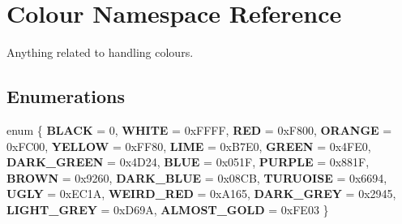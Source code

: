 \hypertarget{namespaceColour}{}\section{Colour Namespace Reference}
\label{namespaceColour}


Anything related to handling colours.  


\subsection*{Enumerations}
\begin{DoxyCompactItemize}
\item 
\mbox{\label{namespaceColour_a7eacc5e4e794b134ef740aa5426df245}} 
enum \{ \newline
{\bfseries B\+L\+A\+CK} = 0, 
{\bfseries W\+H\+I\+TE} = 0x\+F\+F\+FF, 
{\bfseries R\+ED} = 0x\+F800, 
{\bfseries O\+R\+A\+N\+GE} = 0x\+F\+C00, 
\newline
{\bfseries Y\+E\+L\+L\+OW} = 0x\+F\+F80, 
{\bfseries L\+I\+ME} = 0x\+B7\+E0, 
{\bfseries G\+R\+E\+EN} = 0x4\+F\+E0, 
{\bfseries D\+A\+R\+K\+\_\+\+G\+R\+E\+EN} = 0x4\+D24, 
\newline
{\bfseries B\+L\+UE} = 0x051F, 
{\bfseries P\+U\+R\+P\+LE} = 0x881F, 
{\bfseries B\+R\+O\+WN} = 0x9260, 
{\bfseries D\+A\+R\+K\+\_\+\+B\+L\+UE} = 0x08\+CB, 
\newline
{\bfseries T\+U\+R\+U\+O\+I\+SE} = 0x6694, 
{\bfseries U\+G\+LY} = 0x\+E\+C1A, 
{\bfseries W\+E\+I\+R\+D\+\_\+\+R\+ED} = 0x\+A165, 
{\bfseries D\+A\+R\+K\+\_\+\+G\+R\+EY} = 0x2945, 
\newline
{\bfseries L\+I\+G\+H\+T\+\_\+\+G\+R\+EY} = 0x\+D69A, 
{\bfseries A\+L\+M\+O\+S\+T\+\_\+\+G\+O\+LD} = 0x\+F\+E03
 \}
\end{DoxyCompactItemize}
